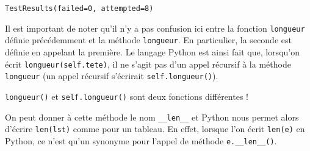 \documentclass[a4paper,17pt]{extarticle}
\makeatletter
\newcommand{\boxspacing}{\kern\kvtcb@left@rule\kern\kvtcb@boxsep}
\newcommand{\prompt}[4]{
        \ttfamily\llap{{\color{#2}[#3]:\hspace{3pt}#4}}\vspace{-\baselineskip}
    }
\makeatother
\begin{document}
            \begin{tcolorbox}[breakable, size=fbox, boxrule=.5pt, pad at break*=1mm, opacityfill=0]
\prompt{Out}{outcolor}{6}{\boxspacing}
\begin{Verbatim}[commandchars=\\\{\}]
TestResults(failed=0, attempted=8)
\end{Verbatim}
\end{tcolorbox}
        
    Il est important de noter qu'il n'y a pas confusion ici entre la
fonction \texttt{longueur} définie précédemment et la méthode
\texttt{longueur}. En particulier, la seconde est définie en appelant la
première. Le langage Python est ainsi fait que, lorsqu'on écrit
\texttt{longueur(self.tete)}, il ne s'agit pas d'un appel récursif à la
méthode \texttt{longueur} (un appel récursif s'écrirait
\texttt{self.longueur()}).

\texttt{longueur()} et \texttt{self.longueur()} sont deux fonctions
différentes !

    On peut donner à cette méthode le nom \texttt{\_\_len\_\_} et Python
nous permet alors d'écrire \texttt{len(lst)} comme pour un tableau. En
effet, lorsque l'on écrit \texttt{len(e)} en Python, ce n'est qu'un
synonyme pour l'appel de méthode \texttt{e.\_\_len\_\_()}.
\end{document}
